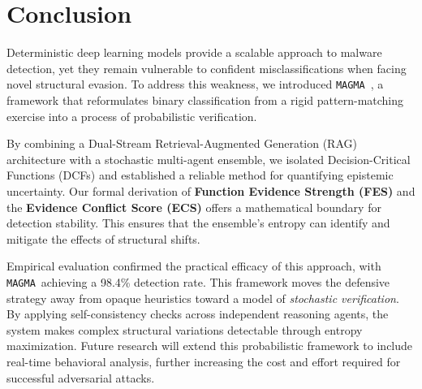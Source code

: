 \documentclass[pdflatex,sn-mathphys-num]{sn-jnl}
\newcommand{\sysname}{\texttt{MAGMA}~}
\begin{document}
\section{Conclusion}
\label{sec:conclusion}

Deterministic deep learning models provide a scalable approach to malware detection, yet they remain vulnerable to confident misclassifications when facing novel structural evasion. To address this weakness, we introduced \sysname, a framework that reformulates binary classification from a rigid pattern-matching exercise into a process of probabilistic verification.

By combining a Dual-Stream Retrieval-Augmented Generation (RAG) architecture with a stochastic multi-agent ensemble, we isolated Decision-Critical Functions (DCFs) and established a reliable method for quantifying epistemic uncertainty. Our formal derivation of \textbf{Function Evidence Strength (FES)} and the \textbf{Evidence Conflict Score (ECS)} offers a mathematical boundary for detection stability. This ensures that the ensemble's entropy can identify and mitigate the effects of structural shifts.

Empirical evaluation confirmed the practical efficacy of this approach, with \sysname achieving a 98.4\% detection rate. This framework moves the defensive strategy away from opaque heuristics toward a model of \textit{stochastic verification}. By applying self-consistency checks across independent reasoning agents, the system makes complex structural variations detectable through entropy maximization. Future research will extend this probabilistic framework to include real-time behavioral analysis, further increasing the cost and effort required for successful adversarial attacks.


\end{document}
